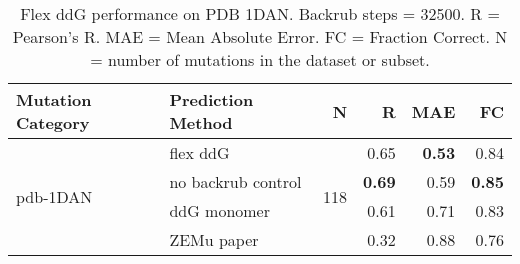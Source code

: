 \begin{table}
  \begin{tabular}{llrrrr}
\toprule
Mutation Category &   Prediction Method &    N &    R &  MAE &   FC \\
\midrule
 \multirow{ 4}{*}{pdb-1DAN} & flex ddG & \multirow{ 4}{*}{118} & 0.65 & \textbf{0.53} & 0.84  \\
 & no backrub control & & \textbf{0.69} & 0.59 & \textbf{0.85}  \\
 & ddG monomer & & 0.61 & 0.71 & 0.83  \\
 & ZEMu paper & & 0.32 & 0.88 & 0.76  \\
\bottomrule
\end{tabular}
  \caption[Flex ddG performance on PDB 1DAN]{
    Flex ddG performance on PDB 1DAN. Backrub steps = 32500. R = Pearson's R. MAE = Mean Absolute Error. FC = Fraction Correct. N = number of mutations in the dataset or subset.
  } \label{tab:table-pdb-1DAN}
\end{table}
